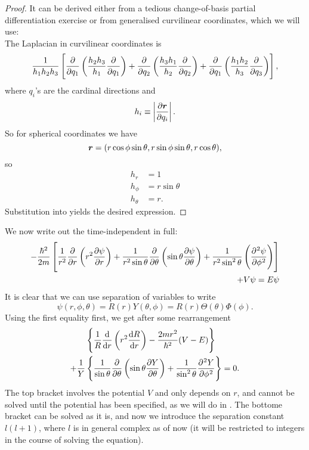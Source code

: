\begin{proof}
It can be derived either from a tedious change-of-basis partial differentiation 
exercise or from generalised curvilinear coordinates, which we will use: \\
The Laplacian in curvilinear coordinates is 
\begin{equation}
\label{lap_curv}
\frac{1}{h_1h_2h_3}\lf[\diffp{}{q_1}\lf(\frac{h_2h_3}{h_1}\diffp{}{q_1} \rt)+\diffp{}{q_2}\lf(\frac{h_3h_1}{h_2}\diffp{}{q_2} \rt)+\diffp{}{q_1}\lf(\frac{h_1h_2}{h_3}\diffp{}{q_3} \rt) \rt], 
\end{equation}
where $q_i$'s are the cardinal directions and 
\begin{equation}
h_i\equiv \lf|\diffp{\bvec{r}}{q_i}\rt|. 
\end{equation}
So for spherical coordinates we have
\begin{equation}
\boldsymbol{r}=(r\cos\phi\sin\theta,r\sin\phi\sin\theta,r\cos\theta),
\end{equation}
so
\begin{subequations}
\begin{align}
h_r&=1\\
h_{\phi}&=r\sin\theta\\
h_{\theta}&=r.
\end{align}
\end{subequations}
Substitution into  yields the desired expression. 
\end{proof}
We now write out the time-independent \sch in full: 
\begin{equation}
\label{sch_spherical}
\begin{split}
	-\frac{\hbar^2}{2m}\lf[\frac{1}{r^2}\diffp*{\lf(r^2\diffp{\psi}{r} \rt)}r+\frac{1}{r^2\sin\theta}\diffp*{\lf(\sin\theta\diffp{\psi}{\theta} \rt)}\theta+\frac{1}{r^2\sin^2\theta}\lf(\diffp[2]{\psi}{\phi}\rt) \rt]&\\
	+V\psi=E\psi&
\end{split}
\end{equation}
It is clear that we can use separation of variables to write
\begin{equation}
\label{3dsep}
\psi(r,\phi,\theta)=R(r)Y(\theta,\phi)=R(r)\Theta(\theta)\Phi(\phi).
\end{equation}
Using the first equality first, we get after some rearrangement
\begin{equation}
\begin{split}
&\lf\{\frac{1}{R}\diff{}{r}\lf(r^2\diff Rr \rt)-\frac{2mr^2}{\hbar^2}(V-E) \rt\}\\
+\frac{1}{Y}&\lf\{\frac{1}{\sin\theta}\diffp{}\theta\lf(\sin\theta\diffp Y\theta \rt)+\frac{1}{\sin^2\theta}\diffp[2]Y\phi \rt\}=0. 
\end{split}
\end{equation}
The top bracket involves the potential $V$ and only depends on $r$, and cannot be solved 
until the potential has been specified, as we will do in . 
The bottome bracket can be solved as it is, and now we introduce the separation constant 
$l(l+1)$, where $l$ is in general complex as of now (it will be restricted to integers 
in the course of solving the equation). 
